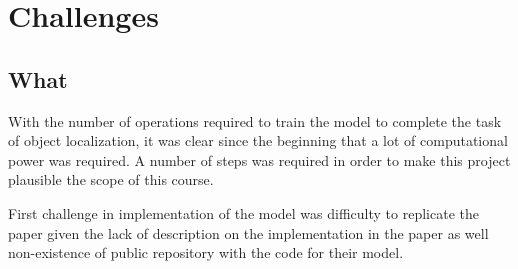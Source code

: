 \section{Challenges}

\subsection{What}

With the number of operations required to train the model to complete the task of object
localization, it was clear since the beginning that a lot of computational power was required. A number
of steps was required in order to make this project plausible the scope of this course.

First challenge in implementation of the model was difficulty to replicate the 
 paper given the lack of description on the implementation in the 
paper as well non-existence of public repository with the code for their model.